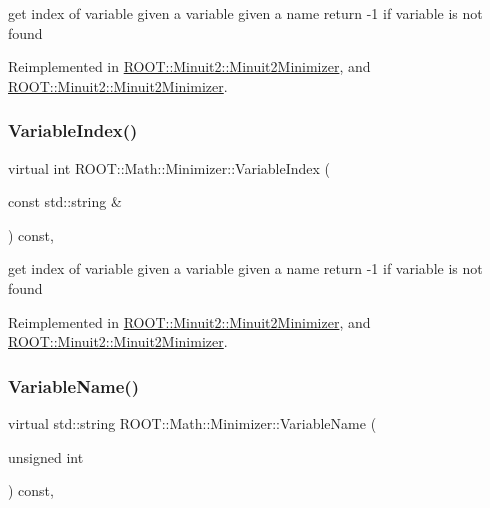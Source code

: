 get index of variable given a variable given a name return -\/1 if variable is not found 

Reimplemented in \mbox{\hyperlink{classROOT_1_1Minuit2_1_1Minuit2Minimizer_a93839e851d16fff50898af2159d8863d}{R\+O\+O\+T\+::\+Minuit2\+::\+Minuit2\+Minimizer}}, and \mbox{\hyperlink{classROOT_1_1Minuit2_1_1Minuit2Minimizer_a93839e851d16fff50898af2159d8863d}{R\+O\+O\+T\+::\+Minuit2\+::\+Minuit2\+Minimizer}}.

\mbox{\label{classROOT_1_1Math_1_1Minimizer_a5f7ff3bdda1f4b1d9e5e1150091a86c5}} 
\subsubsection{\texorpdfstring{VariableIndex()}{VariableIndex()}\hspace{0.1cm}{\footnotesize\ttfamily [2/2]}}
{\footnotesize\ttfamily virtual int R\+O\+O\+T\+::\+Math\+::\+Minimizer\+::\+Variable\+Index (\begin{DoxyParamCaption}\item[{const std\+::string \&}]{ }\end{DoxyParamCaption}) const\hspace{0.3cm}{\ttfamily [inline]}, {\ttfamily [virtual]}}

get index of variable given a variable given a name return -\/1 if variable is not found 

Reimplemented in \mbox{\hyperlink{classROOT_1_1Minuit2_1_1Minuit2Minimizer_a93839e851d16fff50898af2159d8863d}{R\+O\+O\+T\+::\+Minuit2\+::\+Minuit2\+Minimizer}}, and \mbox{\hyperlink{classROOT_1_1Minuit2_1_1Minuit2Minimizer_a93839e851d16fff50898af2159d8863d}{R\+O\+O\+T\+::\+Minuit2\+::\+Minuit2\+Minimizer}}.

\mbox{\label{classROOT_1_1Math_1_1Minimizer_a4d6a3c9c95608b35a25f16afd50690ad}} 
\subsubsection{\texorpdfstring{VariableName()}{VariableName()}\hspace{0.1cm}{\footnotesize\ttfamily [1/2]}}
{\footnotesize\ttfamily virtual std\+::string R\+O\+O\+T\+::\+Math\+::\+Minimizer\+::\+Variable\+Name (\begin{DoxyParamCaption}\item[{unsigned int}]{ }\end{DoxyParamCaption}) const\hspace{0.3cm}{\ttfamily [inline]}, {\ttfamily [virtual]}}


